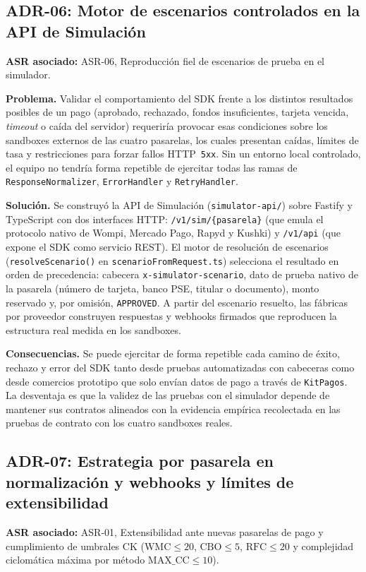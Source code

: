 \subsection{ADR-06: Motor de escenarios controlados en la API de Simulación}
\textbf{ASR asociado:} ASR-06, Reproducción fiel de escenarios de prueba en el simulador.

\textbf{Problema.} Validar el comportamiento del SDK frente a los distintos resultados posibles de un pago (aprobado, rechazado, fondos insuficientes, tarjeta vencida, \textit{timeout} o caída del servidor) requeriría provocar esas condiciones sobre los sandboxes externos de las cuatro pasarelas, los cuales presentan caídas, límites de tasa y restricciones para forzar fallos HTTP~\texttt{5xx}. Sin un entorno local controlado, el equipo no tendría forma repetible de ejercitar todas las ramas de \texttt{ResponseNormalizer}, \texttt{ErrorHandler} y \texttt{RetryHandler}.

\textbf{Solución.} Se construyó la API de Simulación (\texttt{simulator-api/}) sobre Fastify y TypeScript con dos interfaces HTTP: \texttt{/v1/sim/\{pasarela\}} (que emula el protocolo nativo de Wompi, Mercado Pago, Rapyd y Kushki) y \texttt{/v1/api} (que expone el SDK como servicio REST). El motor de resolución de escenarios (\texttt{resolveScenario()} en \texttt{scenarioFromRequest.ts}) selecciona el resultado en orden de precedencia: cabecera \texttt{x-simulator-scenario}, dato de prueba nativo de la pasarela (número de tarjeta, banco PSE, titular o documento), monto reservado y, por omisión, \texttt{APPROVED}. A partir del escenario resuelto, las fábricas por proveedor construyen respuestas y webhooks firmados que reproducen la estructura real medida en los sandboxes.

\textbf{Consecuencias.} Se puede ejercitar de forma repetible cada camino de éxito, rechazo y error del SDK tanto desde pruebas automatizadas con cabeceras como desde comercios prototipo que solo envían datos de pago a través de \texttt{KitPagos}. La desventaja es que la validez de las pruebas con el simulador depende de mantener sus contratos alineados con la evidencia empírica recolectada en las pruebas de contrato con los cuatro sandboxes reales.

\subsection{ADR-07: Estrategia por pasarela en normalización y webhooks y límites de extensibilidad}
\textbf{ASR asociado:} ASR-01, Extensibilidad ante nuevas pasarelas de pago y cumplimiento de umbrales CK ($\mathrm{WMC} \le 20$, $\mathrm{CBO} \le 5$, $\mathrm{RFC} \le 20$ y complejidad ciclomática máxima por método $\mathrm{MAX\_CC} \le 10$).

